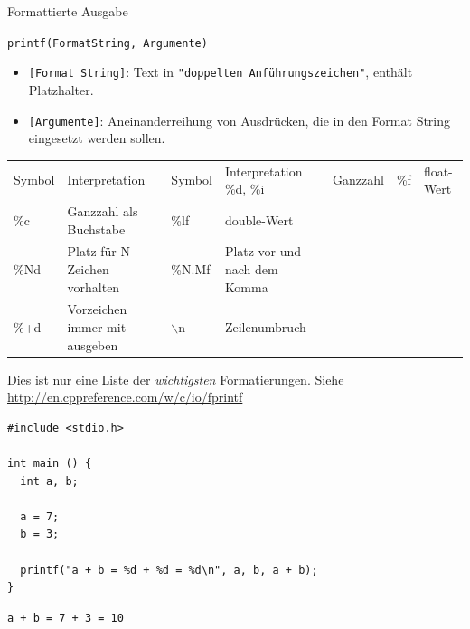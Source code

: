 
\begin{frame}[fragile]{Formattierte Ausgabe}
%
\footnotesize
\begin{codebox}[Syntax]
	\texttt{printf(FormatString, Argumente)}
\end{codebox}
\begin{itemize}
\item \texttt{[Format String]}: Text in \texttt{"doppelten Anführungszeichen"}, enthält
	Platzhalter.
\item \texttt{[Argumente]}: Aneinanderreihung von Ausdrücken, die in den Format String eingesetzt
	werden sollen.
\end{itemize}
%
\begin{table}
	\footnotesize
	\begin{tabularx}
		{\linewidth}
		{LP|LP}
		
		\normalfont Symbol & Interpretation                & \normalfont Symbol & Interpretation \tabcrlf
		\%d, \%i           & Ganzzahl                      & \%f    & float-Wert \\
		\%c                & Ganzzahl als Buchstabe        & \%lf   & double-Wert \\
		\%Nd               & Platz für N Zeichen vorhalten & \%N.Mf & Platz vor und nach dem Komma \\
		\%+d               & Vorzeichen immer mit ausgeben & $\backslash$n & Zeilenumbruch\\
	\end{tabularx}
\end{table}
\tiny Dies ist nur eine Liste der \emph{wichtigsten} Formatierungen. 
Siehe \url{http://en.cppreference.com/w/c/io/fprintf}
%
\end{frame}


\begin{frame}[fragile]
%
\begin{codebox}
\begin{verbatim}
#include <stdio.h>

int main () {
  int a, b;
  
  a = 7;
  b = 3;
  
  printf("a + b = %d + %d = %d\n", a, b, a + b);
}
\end{verbatim}
\end{codebox}
%
\begin{cmdbox}
\begin{verbatim}
a + b = 7 + 3 = 10
\end{verbatim}
\end{cmdbox}
%
\end{frame}

